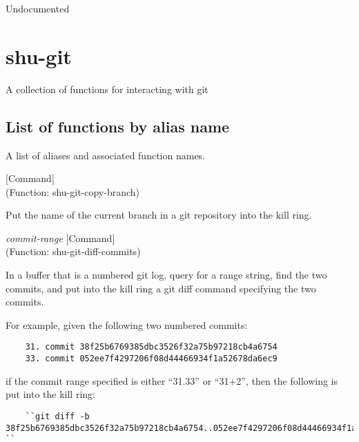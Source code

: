 \begin{doc-string}
Undocumented
\end{doc-string}

\eject
\section{shu-git}



A collection of functions for interacting with git


\subsection{List of functions by alias name}

A list of aliases and associated function names.



\vspace{1em}
\noindent
{}
\usebox{\funcname}
 \hfill [Command]\\%
 (Function: shu-git-copy-branch)

\begin{doc-string}
Put the name of the current branch in a git repository into the kill ring.
\end{doc-string}

\vspace{1em}
\noindent
{}
\usebox{\funcname}\emph{commit-range}
 \hfill [Command]\\%
 (Function: shu-git-diff-commits)

\begin{doc-string}
In a buffer that is a numbered git log, query for a range string, find the two
commits, and put into the kill ring a git diff command specifying the two commits.

For example, given the following two numbered commits:

\small{\begin{verbatim}
    31. commit 38f25b6769385dbc3526f32a75b97218cb4a6754
    33. commit 052ee7f4297206f08d44466934f1a52678da6ec9
\end{verbatim}}

if the commit range specified is either ``31.33'' or ``31+2'', then the following
is put into the kill ring:

\small{\begin{verbatim}
    ``git diff -b 38f25b6769385dbc3526f32a75b97218cb4a6754..052ee7f4297206f08d44466934f1a52678da6ec9 ``
\end{verbatim}}
\end{doc-string}


